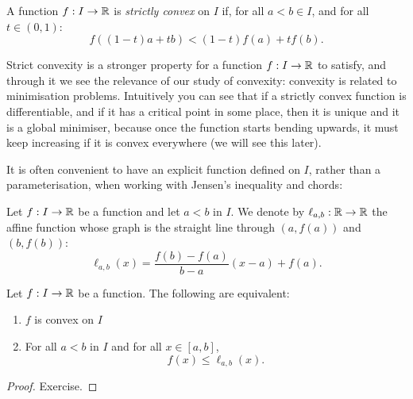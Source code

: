 \documentclass[../analysis1.tex]{subfiles}
\begin{document}
\begin{definition}
    \begin{shaded*}
        A function $f: I \to \mathbb{R}$ is \textit{strictly convex} on $I$ if, for all $a<b \in I$, and for all $t \in (0,1)$:
        \[ f((1-t)a + tb) < (1-t)f(a) + tf(b). \]
    \end{shaded*}
\end{definition}
\begin{remark}
    Strict convexity is a stronger property for a function $f:I\to\mathbb{R}$ to satisfy, and through it we see the relevance of our study of convexity: convexity is related to minimisation problems. Intuitively you can see that if a strictly convex function is differentiable, and if it has a critical point in some place, then it is unique and it is a global minimiser, because once the function starts bending upwards, it must keep increasing if it is convex everywhere (we will see this later).
\end{remark}

It is often convenient to have an explicit function defined on $I$, rather than a parameterisation, when working with Jensen's inequality and chords:

\begin{definition}
\label{def:chordline}
    \begin{shaded*}
        Let $f:I\to\mathbb{R}$ be a function and let $a<b$ in $I$. We denote by $\ell_{a,b}:\mathbb{R}\to\mathbb{R}$ the affine function whose graph is the straight line through $(a,f(a))$ and $(b,f(b))$:
        \[\ell_{a,b}(x)=\frac{f(b)-f(a)}{b-a}(x-a)+f(a).\]
    \end{shaded*}
\end{definition}

\begin{lemma}
    \begin{shaded*}
        Let $f:I\to\mathbb{R}$ be a function. The following are equivalent:
        \begin{enumerate}
            \item[1.] $f$ is convex on $I$
            \item[2.] For all $a<b$ in $I$ and for all $x\in[a,b]$, \[f(x)\le \ell_{a,b}(x).\]
        \end{enumerate}
    \end{shaded*}
\end{lemma}
\begin{proof}
    Exercise.\qedhere
\end{proof}
\end{document}
